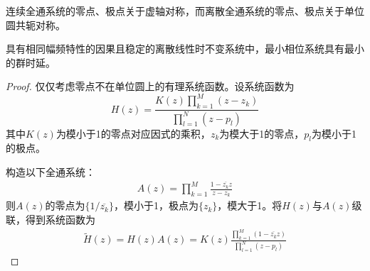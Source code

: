连续全通系统的零点、极点关于虚轴对称，而离散全通系统的零点、极点关于单位圆共轭对称。

\begin{proposition}
    具有相同幅频特性的因果且稳定的离散线性时不变系统中，最小相位系统具有最小的群时延。
\end{proposition}
\begin{proof}
    仅仅考虑零点不在单位圆上的有理系统函数。设系统函数为
    $$H(z)=\frac{K(z)\prod_{k=1}^{M}(z-z_k)}{\prod_{l=1}^{N}(z-p_l)}$$
    其中$K(z)$为模小于1的零点对应因式的乘积，$z_k$为模大于1的零点，$p_l$为模小于1的极点。

    构造以下全通系统：
    \begin{align*}
        A(z)=\prod_{k=1}^{M}\frac{1-\overline{z_k} z}{z-z_k}
    \end{align*}
    则$A(z)$的零点为$\{1/\overline{z_k}\}$，模小于1，极点为$\{z_k\}$，模大于1。将$H(z)$与$A(z)$级联，得到系统函数为
    \begin{align*}
    \tilde{H}(z)=H(z)A(z)=K(z)\frac{\prod_{k=1}^{M}(1-\overline{z_k} z)}{\prod_{l=1}^{N}(z-p_l)}
    \end{align*}


\end{proof}
